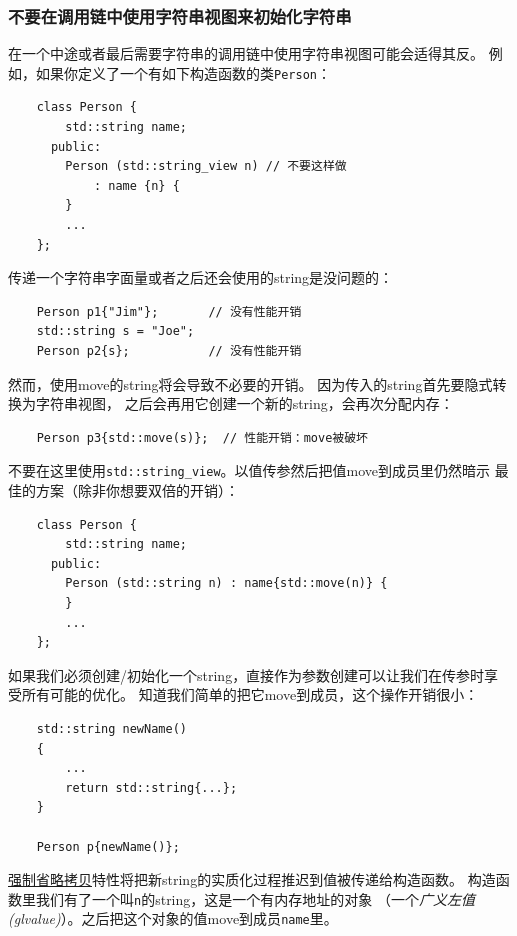 \subsubsection{不要在调用链中使用字符串视图来初始化字符串}
在一个中途或者最后需要字符串的调用链中使用字符串视图可能会适得其反。
例如，如果你定义了一个有如下构造函数的类\texttt{Person}：
\begin{lstlisting}
    class Person {
        std::string name;
      public:
        Person (std::string_view n) // 不要这样做
            : name {n} {
        }
        ...
    };
\end{lstlisting}
传递一个字符串字面量或者之后还会使用的string是没问题的：
\begin{lstlisting}
    Person p1{"Jim"};       // 没有性能开销
    std::string s = "Joe";
    Person p2{s};           // 没有性能开销
\end{lstlisting}
然而，使用move的string将会导致不必要的开销。
因为传入的string首先要隐式转换为字符串视图，
之后会再用它创建一个新的string，会再次分配内存：
\begin{lstlisting}
    Person p3{std::move(s)};  // 性能开销：move被破坏
\end{lstlisting}
不要在这里使用\texttt{std::string\_view}。以值传参然后把值move到成员里仍然暗示
最佳的方案（除非你想要双倍的开销）：
\begin{lstlisting}
    class Person {
        std::string name;
      public:
        Person (std::string n) : name{std::move(n)} {
        }
        ...
    };
\end{lstlisting}
如果我们必须创建/初始化一个string，直接作为参数创建可以让我们在传参时享受所有可能的优化。
知道我们简单的把它move到成员，这个操作开销很小：
\begin{lstlisting}
    std::string newName()
    {
        ...
        return std::string{...};
    }

    Person p{newName()};
\end{lstlisting}
\hyperref[ch5]{强制省略拷贝}特性将把新string的实质化过程推迟到值被传递给构造函数。
构造函数里我们有了一个叫\texttt{n}的string，这是一个有内存地址的对象
（一个\emph{广义左值(glvalue)}）。之后把这个对象的值move到成员\texttt{name}里。

